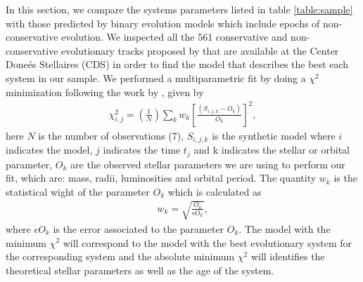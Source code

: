 In this section, we compare the systems parameters listed in table \ref{table:sample} with those predicted by binary evolution models which include epochs of non-conservative evolution. We inspected all the 561 conservative and non-conservative evolutionary tracks proposed by \citet{vanrensbergen2008, vanrensbergen2011} that are available at the Center Done\'es Stellaires (CDS) in order to find the model that describes the best each system in our sample. We performed a multiparametric fit by doing a $\chi^{2}$ minimization following the work by \citet{mennickent2012}, given by
\begin{eqnarray}
\chi^{2}_{i,j}=\left(\frac{1}{N}\right)\sum_{k}w_{k}\left[\frac{(S_{i,j,k}-O_{k})}{O_{k}}\right]^{2},
\end{eqnarray}
here $N$ is the number of observations (7), $S_{i,j,k}$ is the synthetic model where $i$ indicates the model, $j$ indicates the time $t_{j}$ and k indicates the stellar or orbital parameter, $O_{k}$ are the observed stellar parameters we are using to perform our fit, which are: mass, radii, luminosities and orbital period. The quantity $w_{k}$ is the statistical wight of the parameter $O_{k}$ which is calculated as
\begin{eqnarray}
w_{k}=\sqrt{\frac{O_{k}}{\epsilon O_{k}}},
\end{eqnarray} 
where $\epsilon O_{k}$ is the error associated to the parameter $O_{k}$. The model with the minimum $\chi^{2}$ will correspond to the model with the best evolutionary system for the corresponding system and the absolute minimum $\chi^{2}$ will identifies the theoretical stellar parameters as well as the age of the system.

